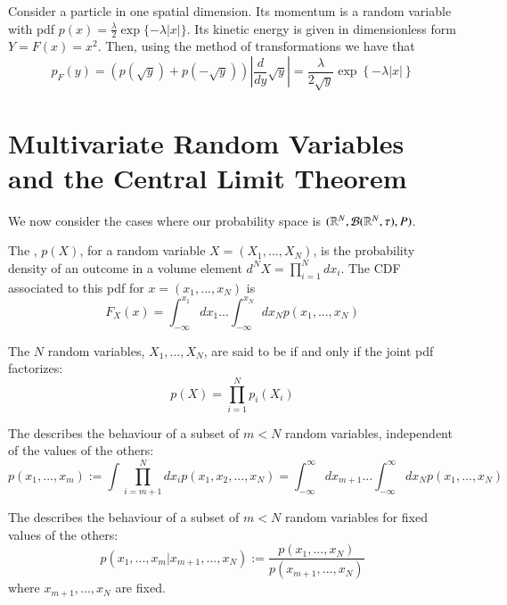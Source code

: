 \documentclass[12pt, a4paper, oneside, openright, titlepage]{book}
\begin{document}
\begin{eg}
    Consider a particle in one spatial dimension. Its momentum is a random variable with pdf $p(x) = \frac{\lambda}{2}\exp\{-\lambda|x|\}$. Its kinetic energy is given in dimensionless form $Y = F(x) = x^2$. Then, using the method of transformations we have that $$p_F(y) = (p(\sqrt{y})+p(-\sqrt{y}))\left|\frac{d}{dy}\sqrt{y}\right| = \frac{\lambda}{2\sqrt{y}}\exp\left\{-\lambda|x|\right\}$$
\end{eg}



\section{Multivariate Random Variables and the Central Limit Theorem}

We now consider the cases where our probability space is $(\mathbb R^N,\mathcal{B}(\mathbb R^N,\tau),P)$.

\begin{defn}
    The , $p(X)$, for a random variable $X = (X_1,...,X_N)$, is the probability density of an outcome in a volume element $d^NX = \prod_{i=1}^Ndx_i$. The CDF associated to this pdf for $x = (x_1,...,x_N)$ is \begin{equation*}
        F_X(x) = \int_{-\infty}^{x_1}dx_1...\int_{-\infty}^{x_N}dx_Np(x_1,...,x_N)
    \end{equation*}
\end{defn}

\begin{defn}
    The $N$ random variables, $X_1,...,X_N$, are said to be  if and only if the joint pdf factorizes: \begin{equation*}
        p(X) = \prod_{i=1}^Np_i(X_i)
    \end{equation*}
\end{defn}

\begin{defn}
    The  describes the behaviour of a subset of $m < N$ random variables, independent of the values of the others: \begin{equation*}
        p(x_1,...,x_m) := \int\prod_{i=m+1}^Ndx_ip(x_1,x_2,...,x_N) = \int_{-\infty}^{\infty}dx_{m+1}...\int_{-\infty}^{\infty}dx_Np(x_1,...,x_N)
    \end{equation*}
\end{defn}

\begin{defn}
    The  describes the behaviour of a subset of $m < N$ random variables for fixed values of the others: \begin{equation*}
        p(x_1,...,x_m\vert x_{m+1},...,x_N) := \frac{p(x_1,...,x_N)}{p(x_{m+1},...,x_N)}
    \end{equation*}
    where $x_{m+1},...,x_N$ are fixed.
\end{defn}
\end{document}
